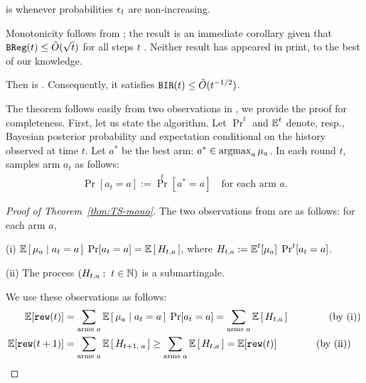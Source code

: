 \begin{corollary}\label{cor:mono-eps-greedy}
\DynamicEpsGreedy is \bmonotone whenever probabilities $\epsilon_t$ are non-increasing.
\end{corollary}

Monotonicity follows from \citet{Selke-BE-2020}; the \BIR result is an immediate corollary given that
    $\mathtt{BReg}(t) \leq \tilde{O}(\sqrt{t})$
for all steps $t$ \citep{Russo-MathOR-14}. Neither result has appeared in print, to the best of our knowledge.

\begin{theorem}\label{thm:TS-mono}
 Then \Thompson is \bmonotone. Consequently, it satisfies $\mathtt{BIR}(t)\leq \tilde{O}(t^{-1/2})$.
\end{theorem}


The theorem follows easily from two observations in  \citet{Selke-BE-2020}, we provide the proof for completeness. First, let us state the algorithm. Let $\Pr^t$ and $\E^t$ denote, resp., Bayesian posterior probability and expectation conditional on the history observed at time $t$. Let $a^*$ be the best arm: $a^*\in \argmax_a \mu_a$. In each round $t$, \Thompson samples arm $a_t$ as follows:
\begin{align}\label{eq:TS-defn}
    \Pr[a_t=a] := {\Pr}^t[a^*=a]
    \quad\text{for each arm $a$}.
\end{align}


\begin{proof}[Proof of Theorem~\ref{thm:TS-mono}]
The two observations from \citet{Selke-BE-2020}  are as follows: for each arm $a$,
\begin{OneLiners}
\item[(i)]
$\E\sbr{ \mu_a \mid a_t = a} \;\Pr[a_t=a] = \E\sbr{H_{t,a}}$,
where
    $H_{t,a} := \E^t[\mu_a]\; \Pr^t[a_t = a]$.

\item[(ii)]
The process $(H_{t,a}:\;t\in\mathbb{N})$
is a submartingale.
\end{OneLiners}

We use these observations as follows:
\begin{align*}
\E[\rew(t)]
    &= \sum_{\text{arms $a$}}
        \E\sbr{ \mu_a \mid a_t = a} \;\Pr[a_t=a]
    =\sum_{\text{arms $a$}}  \E\sbr{ H_{t,a} }
    \qquad\EqComment{by (i)}\\
\E[\rew(t+1)]
    &= \sum_{\text{arms $a$}}  \E\sbr{ H_{t+1,\;a} }
    \geq \sum_{\text{arms $a$}}  \E\sbr{ H_{t,a} }
    =\E[\rew(t)]
    \qquad\EqComment{by (ii)} \qedhere
\end{align*}
\end{proof} 